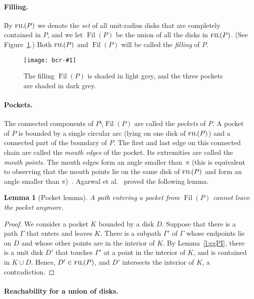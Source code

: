 \documentclass[a4paper]{article}
\DeclareMathOperator{\FIL}{\textsc{fil}}
\DeclareMathOperator{\fil}{Fil}
\newtheorem{lemma}[theorem]{Lemma}
\newcommand{\epsfigure}[2]{
  \begin{figure}[htb]
    \centerline{\texttt{[image: bcr-\#1]}}
    \caption{#2}
    \label{f:#1}
  \end{figure}}
\begin{document}
\paragraph{Filling.}

By $\FIL(P)$ we denote the \emph{set} of all unit-radius disks that
are completely contained in $P$, and we let $\fil(P)$ be the union of
all the disks in $\FIL(P)$. (See Figure~\ref{f:elp}.)  Both $\FIL(P)$
and $\fil(P)$ will be called the \emph{filling} of $P$.
\epsfigure{elp}{The filling $\fil(P)$ is shaded in light grey, and the 
three pockets are shaded in dark grey.}


\paragraph{Pockets.}

The connected components of $P\setminus \fil(P)$ are called the
\emph{pockets} of $P$.  A pocket of $P$ is bounded by a single
circular arc (lying on one disk of $\FIL(P)$) and a connected part of
the boundary of $P$. The first and last edge on this connected chain
are called the \emph{mouth edges} of the pocket.  Its extremities are
called the \emph{mouth points}.  The mouth edges form an angle smaller
than~$\pi$ (this is equivalent to observing that the mouth points lie
on the same disk of $\FIL(P)$ and form an angle smaller than
$\pi$)~\cite{ablrsw-ccspc-02}. Agarwal et al.~\cite{ablrsw-ccspc-02}
proved the following lemma.


\begin{lemma}[Pocket lemma]\label{l:pocket}
  A path entering a pocket from $\fil(P)$ cannot leave the pocket
  anymore.
\end{lemma}
\begin{proof}
  We consider a pocket $K$ bounded by a disk $D$. Suppose that there
  is a path $\Gamma$ that enters and leaves $K$.  There is a subpath
  $\Gamma'$ of $\Gamma$ whose endpoints lie on $D$ and whose other
  points are in the interior of $K$.  By Lemma~\ref{l:ggPI}, there is
  a unit disk $D'$ that touches $\Gamma'$ at a point in the interior
  of $K$, and is contained in $K \cup D$. Hence, $D' \in \FIL(P)$, and
  $D'$ intersects the interior of $K$, a contradiction.
\end{proof}

\paragraph{Reachability for a union of disks.}
 
\end{document}
